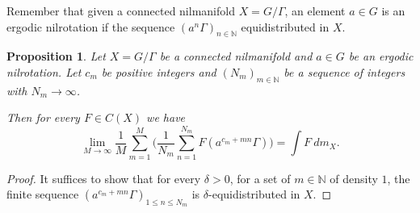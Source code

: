 \documentclass[11pt]{amsart}
\newcommand{\N}{\mathbb{N}}
\theoremstyle{plain}
\newtheorem{proposition}[theorem]{Proposition}
\theoremstyle{definition}
\theoremstyle{remark}
\begin{document}
Remember that given a connected nilmanifold $X=G/\Gamma$, an element
$a\in G$ is an ergodic nilrotation if the sequence
$(a^n\Gamma)_{n\in\N}$ equidistributed in $X$.
\begin{proposition}\label{L:equidistribution}
  Let $X=G/\Gamma$ be a connected nilmanifold  and $a\in G$ be an ergodic nilrotation. Let  $c_m$
  be positive integers and $(N_m)_{m\in\N}$ be a sequence of integers with
    $N_m\to \infty$.

  Then for every $F\in C(X)$
  we have
$$
\lim_{M\to\infty}\frac{1}{M}\sum_{m=1}^M\Big(\frac{1}{N_m}\sum_{n=1}^{N_m} F(a^{c_m+mn}\Gamma)\Big)= \int F \
dm_X.
$$
\end{proposition}
\begin{proof}
  It suffices to show that for every $\delta>0$, for a set of $m\in
  \N$ of density $1$, the finite sequence $(a^{c_m+mn}\Gamma)_{1\leq
    n\leq N_m}$ is $\delta$-equidistributed in $X$.


\end{proof}
\end{document}
